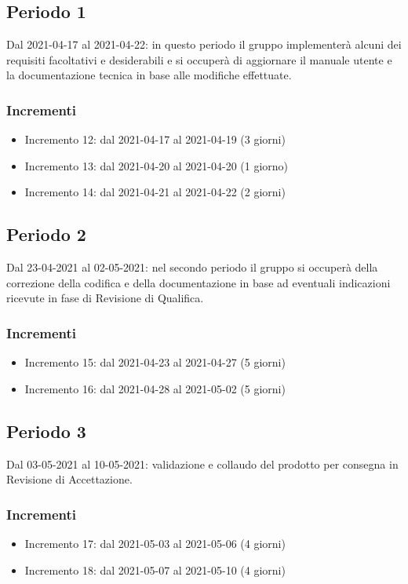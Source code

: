 \subsection{Periodo 1}
Dal 2021-04-17 al 2021-04-22: in questo periodo il gruppo implementerà alcuni dei requisiti facoltativi e desiderabili e si occuperà di aggiornare il manuale utente e la documentazione tecnica in base alle modifiche effettuate. 
\subsubsection{Incrementi}
\begin{itemize}
	\item Incremento 12: dal 2021-04-17 al 2021-04-19 (3 giorni)
	\item Incremento 13: dal 2021-04-20 al 2021-04-20 (1 giorno)
	\item Incremento 14: dal 2021-04-21 al 2021-04-22 (2 giorni)
\end{itemize}
\subsection{Periodo 2}
Dal 23-04-2021 al 02-05-2021: nel secondo periodo il gruppo si occuperà della correzione della codifica e della documentazione in base ad eventuali indicazioni ricevute in fase di Revisione di Qualifica.
\subsubsection{Incrementi}
\begin{itemize}
	\item Incremento 15: dal 2021-04-23 al 2021-04-27 (5 giorni)
	\item Incremento 16: dal 2021-04-28 al 2021-05-02 (5 giorni)
\end{itemize}
\subsection{Periodo 3}
Dal 03-05-2021 al 10-05-2021: validazione e collaudo del prodotto per consegna in Revisione di Accettazione.
\subsubsection{Incrementi}
\begin{itemize}
	\item Incremento 17: dal 2021-05-03 al 2021-05-06 (4 giorni)
	\item Incremento 18: dal 2021-05-07 al 2021-05-10 (4 giorni)
\end{itemize}
